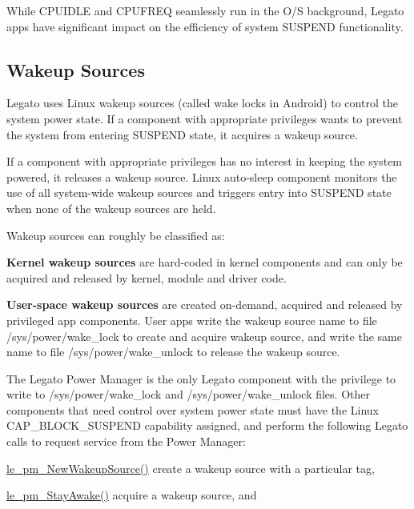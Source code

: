 While C\+P\+U\+I\+D\+L\+E and C\+P\+U\+F\+R\+E\+Q seamlessly run in the O/\+S background, Legato apps have significant impact on the efficiency of system S\+U\+S\+P\+E\+N\+D functionality.\hypertarget{how_to_power_mgmt_howToPowerMgmt_wakeupSources}{}\subsection{Wakeup Sources}\label{how_to_power_mgmt_howToPowerMgmt_wakeupSources}
Legato uses Linux wakeup sources (called wake locks in Android) to control the system power state. If a component with appropriate privileges wants to prevent the system from entering S\+U\+S\+P\+E\+N\+D state, it acquires a wakeup source.

If a component with appropriate privileges has no interest in keeping the system powered, it releases a wakeup source. Linux auto-\/sleep component monitors the use of all system-\/wide wakeup sources and triggers entry into S\+U\+S\+P\+E\+N\+D state when none of the wakeup sources are held.

Wakeup sources can roughly be classified as\+:


\begin{DoxyItemize}
\item {\bfseries Kernel wakeup sources} are hard-\/coded in kernel components and can only be acquired and released by kernel, module and driver code.
\item {\bfseries User-\/space wakeup sources} are created on-\/demand, acquired and released by privileged app components. User apps write the wakeup source name to file {\ttfamily /sys/power/wake\+\_\+lock} to create and acquire wakeup source, and write the same name to file {\ttfamily /sys/power/wake\+\_\+unlock} to release the wakeup source.
\end{DoxyItemize}

The Legato Power Manager is the only Legato component with the privilege to write to {\ttfamily /sys/power/wake\+\_\+lock} and {\ttfamily /sys/power/wake\+\_\+unlock} files. Other components that need control over system power state must have the Linux C\+A\+P\+\_\+\+B\+L\+O\+C\+K\+\_\+\+S\+U\+S\+P\+E\+N\+D capability assigned, and perform the following Legato calls to request service from the Power Manager\+:

\hyperlink{le__pm__interface_8h_a85038248bcddc8963f7280ffa53acf62}{le\+\_\+pm\+\_\+\+New\+Wakeup\+Source()} create a wakeup source with a particular tag,

\hyperlink{le__pm__interface_8h_a6be9b6c443c506b0ce29da79e53e2534}{le\+\_\+pm\+\_\+\+Stay\+Awake()} acquire a wakeup source, and

